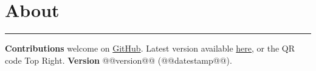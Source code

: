 \section{About}
\hrule

\medskip

\textbf{Contributions} welcome on \href{https://github.com/robert-will-brown/video-streaming-cheatsheet}{GitHub}.
Latest version available \href{https://bit.ly/3p1Omqh}{here}, or the QR code Top Right.
\textbf{Version} @@version@@ (@@datestamp@@).
